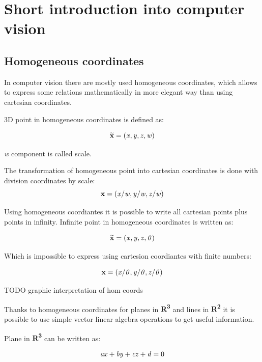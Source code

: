 \documentclass[a4paper,12pt]{report}
\newcommand{\evect}[1]{
{\bf #1}
}
\newcommand{\ehvect}[1]{
{\bf \widetilde{#1}}
}
\newcommand{\escal}[1]{
{\it #1}
}
\newcommand{\eucl}[1]{
{\bf R\textsuperscript{#1}}
}
\begin{document}
\section{Short introduction into computer vision}

\subsection{Homogeneous coordinates}

In computer vision there are mostly used homogeneous coordinates, which allows to express some relations
mathematically in more elegant way than using cartesian coordinates. 

3D point in homogeneous coordinates is defined as:

\begin{equation}
\ehvect{x} = (\escal{x}, \escal{y}, \escal{z}, \escal{w})
\end{equation}

\escal{w} component is called scale.

The transformation of homogeneous point into cartesian coordinates is done with division 
coordinates by scale:
\begin{equation}
\evect{x} = (\escal{x} / \escal{w}, \escal{y} / \escal{w}, \escal{z} / \escal{w})
\end{equation}

Using homogeneous coordiantes it is possible to write all cartesian points plus points in infinity.
Infinite point in homogeneous coordinates is written as: 

\begin{equation}
\ehvect{x} = (\escal{x}, \escal{y}, \escal{z}, \escal{0})
\end{equation}

Which is impossible to express using cartesion coordiantes with finite numbers:

\begin{equation}
\evect{x} = (\escal{x} / \escal{0}, \escal{y} / \escal{0}, \escal{z} / \escal{0})
\end{equation}

TODO graphic interpretation of hom coords 

Thanks to homogeneous coordinates for planes in \eucl{3} and lines in \eucl{2} it is possible to use simple vector linear algebra operations 
to get useful information.

Plane in \eucl{3} can be written as:

\begin{equation}
\escal{a}\escal{x} + \escal{b}\escal{y} + \escal{c}\escal{z} + \escal{d} = 0
\end{equation}
\end{document}
